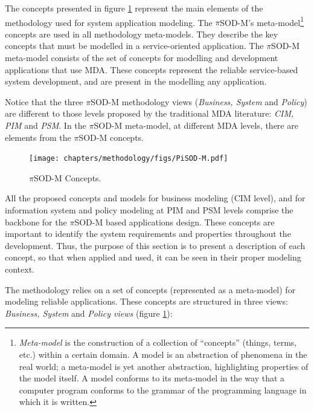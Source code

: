 
The concepts presented in figure \ref{fig:pisodm-concepts} represent the main
elements of the methodology used for system application modeling. The $\pi$SOD-M's
meta-model\footnote{\textit{Meta-model} is the construction of a collection of
``concepts'' (things, terms, etc.) within a certain domain. A model is an
abstraction of phenomena in the real world; a meta-model is yet another abstraction, highlighting properties of the model
itself. A model conforms to its meta-model in the way that a computer program
conforms to the grammar of the programming language in which it is written.}
concepts are used in all methodology meta-models. They
describe the key concepts that must be modelled in a service-oriented
application. The $\pi$SOD-M meta-model consists of the set of concepts for
modelling and development applications that use MDA. These concepts represent the reliable
service-based system development, and are present in the modelling any
application.


Notice that the three $\pi$SOD-M methodology views (\textit{Business, System}
and \textit{Policy}) are different to those levels proposed by the traditional
MDA literature: \textit{CIM, PIM} and \textit{PSM}. In the $\pi$SOD-M
meta-model, at different MDA levels, there are elements from the $\pi$SOD-M
concepts.  

\begin{figure}[ht!]
\centering
\texttt{[image: chapters/methodology/figs/PiSOD-M.pdf]}
\caption{$\pi$SOD-M Concepts.}
\label{fig:pisodm-concepts}
\end{figure}
 
 All the proposed concepts and models for business modeling (CIM
 level), and for information system and policy modeling at PIM and PSM
 levels comprise the backbone for the $\pi$SOD-M based applications design.
 These concepts are important to identify the system requirements and properties throughout the
 development. Thus, the purpose of this section is to present a description of
 each concept, so that when applied and used, it can be seen in their
 proper modeling context. 
 


The methodology relies on a
set of concepts (represented as a meta-model) for modeling
reliable applications. These concepts are structured in three views:
\textit{Business, System} and \textit{Policy views} (figure
\ref{fig:pisodm-concepts}):

